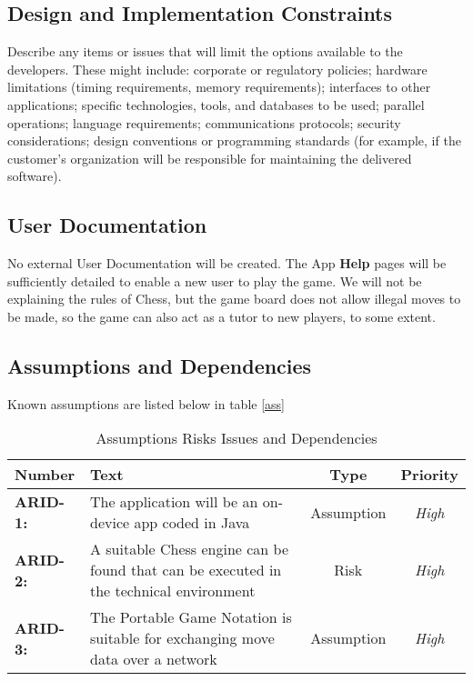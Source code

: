 \documentclass[a4paper,10pt]{article}
\begin{document}
\subsection{Design and Implementation Constraints}


Describe any items or issues that will limit the options available to the developers. These might include: corporate or regulatory policies; hardware limitations (timing requirements, memory requirements); interfaces to other applications; specific technologies, tools, and databases to be used; parallel operations; language requirements; communications protocols; security considerations; design conventions or programming standards (for example, if the customer’s organization will be responsible for maintaining the delivered software).

\subsection{User Documentation}
No external User Documentation will be created. The App \textbf{Help} pages will be sufficiently detailed to enable a new user to play the game. We will not be explaining the rules of Chess, but the game board does not allow illegal moves to be made, so the game can also act as a tutor to new players, to some extent. 

\subsection{Assumptions and Dependencies}

Known assumptions are listed below in table \ref{ass}

\begin{table}[H]
\caption{Assumptions Risks Issues and Dependencies}
\label{table:Ass}
\begin{tabular}{|| l | p{10.5cm}  |  c  | c ||} \hline  

\textbf{Number} & \textbf{Text} & \textbf{Type} & \textbf{Priority}\\ \hline

\textbf{ARID-1:}  & 
The application will be an on-device app coded in Java
& Assumption & \textit{ High} \\

\textbf{ARID-2:}  & 
A suitable Chess engine can be found that can be executed in the technical environment
& Risk & \textit{ High} \\

\textbf{ARID-3:}  & 
The Portable Game Notation \cite{PGN-94} is suitable for exchanging move data over a network
& Assumption & \textit{ High} \\


\hline
\end{tabular}
\end{table}
\end{document}
